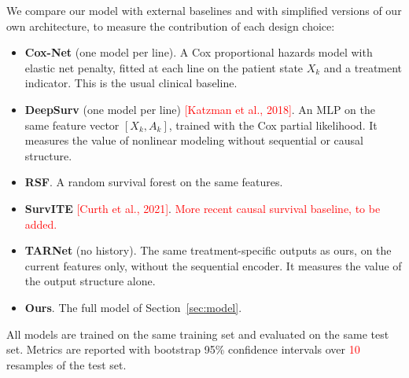 \documentclass[a4paper,10pt]{article}
\newcommand{\todo}[1]{\textcolor{red}{#1}}
\begin{document}
We compare our model with external baselines and with simplified versions of our own architecture, to measure the contribution of each design choice:
\begin{itemize}
    \item \textbf{Cox-Net} (one model per line). A Cox proportional hazards model with elastic net penalty, fitted at each line on the patient state $X_k$ and a treatment indicator. This is the usual clinical baseline.
    \item \textbf{DeepSurv} (one model per line) \todo{[Katzman et al., 2018]}. An MLP on the same feature vector $[X_k, A_k]$, trained with the Cox partial likelihood. It measures the value of nonlinear modeling without sequential or causal structure.
    \item \textbf{RSF}. A random survival forest on the same features.
    \item \textbf{SurvITE} \todo{[Curth et al., 2021]}. \todo{More recent causal survival baseline, to be added.}
    \item \textbf{TARNet} (no history). The same treatment-specific outputs as ours, on the current features only, without the sequential encoder. It measures the value of the output structure alone.
    \item \textbf{Ours}. The full model of Section~\ref{sec:model}.
\end{itemize}
All models are trained on the same training set and evaluated on the same test set. Metrics are reported with bootstrap 95\% confidence intervals over \todo{10} resamples of the test set.
\end{document}
